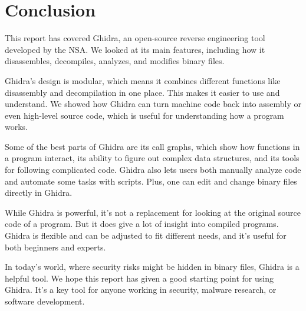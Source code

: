 \section{Conclusion}

This report has covered Ghidra, an open-source reverse engineering tool developed by the NSA. We looked at its main features, including how it disassembles, decompiles, analyzes, and modifies binary files.

Ghidra's design is modular, which means it combines different functions like disassembly and decompilation in one place. This makes it easier to use and understand. We showed how Ghidra can turn machine code back into assembly or even high-level source code, which is useful for understanding how a program works.

Some of the best parts of Ghidra are its call graphs, which show how functions in a program interact, its ability to figure out complex data structures, and its tools for following complicated code. Ghidra also lets users both manually analyze code and automate some tasks with scripts. Plus, one can edit and change binary files directly in Ghidra.

While Ghidra is powerful, it's not a replacement for looking at the original source code of a program. But it does give a lot of insight into compiled programs. Ghidra is flexible and can be adjusted to fit different needs, and it's useful for both beginners and experts.

In today's world, where security risks might be hidden in binary files, Ghidra is a helpful tool. We hope this report has given a good starting point for using Ghidra. It's a key tool for anyone working in security, malware research, or software development.
